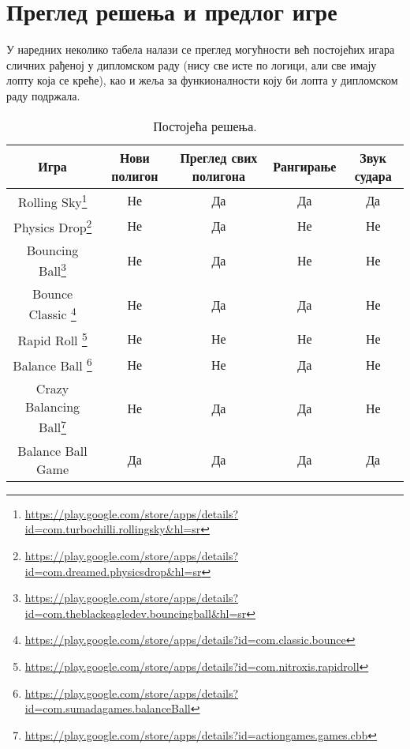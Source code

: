 \chapter{Преглед решења и предлог игре} \label{CurrentSolutions}

У наредних неколико табела налази се преглед могућности већ постојећих игара сличних рађеној у дипломском раду (нису све исте по логици, али све имају лопту која се креће), као и жеља за функионалности коју би лопта у дипломском раду подржала. 

\begin{table}[H]
\begin{tabular}{|c|c|c|c|c|}
\hline 
Игра & Нови полигон & Преглед свих полигона& Рангирање & Звук судара \\ 
\hline 
Rolling Sky\footnote{\url{https://play.google.com/store/apps/details?id=com.turbochilli.rollingsky&hl=sr}} & Не & Да &  Да& Да\\ 
Physics Drop\footnote{\url{https://play.google.com/store/apps/details?id=com.dreamed.physicsdrop&hl=sr}} & Не & Да &  Не & Не\\ 
Bouncing Ball\footnote{\url{https://play.google.com/store/apps/details?id=com.theblackeagledev.bouncingball&hl=sr}} & Не & Да &  Не& Не\\
Bounce Classic \footnote{\url{https://play.google.com/store/apps/details?id=com.classic.bounce}} & Не & Да &  Да& Не\\ 
Rapid Roll \footnote{\url{https://play.google.com/store/apps/details?id=com.nitroxis.rapidroll}} & Не & Не&  Не& Не\\ 
Balance Ball \footnote{\url{https://play.google.com/store/apps/details?id=com.sumadagames.balanceBall}} & Не & Не&  Да &Не\\ 
Crazy Balancing Ball\footnote{\url{https://play.google.com/store/apps/details?id=actiongames.games.cbb}} & Не & Да&  Да &Не\\ 
Balance Ball Game & Да & Да & Да & Да\\
\hline 	
\end{tabular} 

\caption{Постојећа решења.} \label{ExistingSolutions1}
\end{table}

